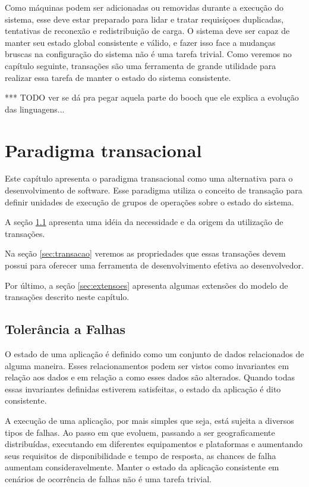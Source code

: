 \documentclass[11pt,twoside,a4paper]{book}
\begin{document}
Como máquinas podem ser adicionadas ou removidas durante a execução do sistema, esse deve estar preparado para lidar e tratar requisiçoes duplicadas, tentativas de reconexão e redistribuição de carga. O sistema deve ser capaz de manter seu estado global consistente e válido, e fazer isso face a mudanças bruscas na configuração do sistema não é uma tarefa trivial. Como veremos no capítulo seguinte, transações são uma ferramenta de grande utilidade para realizar essa tarefa de manter o estado do sistema consistente. 

*** TODO ver se dá pra pegar aquela parte do booch que ele explica a evolução das linguagens...

\chapter{Paradigma transacional}
\label{chap:transacao}
Este capítulo apresenta o paradigma transacional como uma alternativa para o desenvolvimento de software. Esse paradigma utiliza o conceito de transação para definir unidades de execução de grupos de operações sobre o estado do sistema.

A seção \ref{sec:tolerancia_a_falhas} apresenta uma idéia da necessidade e da origem da utilização de transações.

Na seção \ref{sec:transacao} veremos as propriedades que essas transações devem possui para oferecer uma ferramenta de desenvolvimento efetiva ao desenvolvedor.

Por último, a seção \ref{sec:extensoes} apresenta algumas extensões do modelo de transações descrito neste capítulo.

\section{Tolerância a Falhas}
\label{sec:tolerancia_a_falhas}
O estado de uma aplicação é definido como um conjunto de dados relacionados de alguma maneira. Esses relacionamentos podem ser vistos como invariantes em relação aos dados e em relação a como esses dados são alterados. Quando todas essas invariantes definidas estiverem satisfeitas, o estado da aplicação é dito consistente.

A execução de uma aplicação, por mais simples que seja, está sujeita a diversos tipos de falhas. Ao passo em que evoluem, passando a ser geograficamente distribuídas, executando em diferentes equipamentos e plataformas e aumentando seus requisitos de disponibilidade e tempo de resposta, as chances de falha aumentam consideravelmente. Manter o estado da aplicação consistente em cenários de ocorrência de falhas não é uma tarefa trivial.
\end{document}
